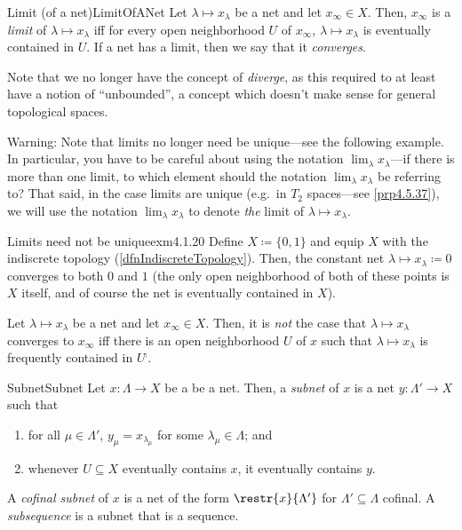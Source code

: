 \begin{dfn}{Limit (of a net)}{LimitOfANet}
Let $\lambda \mapsto x_\lambda$ be a net and let $x_\infty \in X$.  Then, $x_\infty$ is a \emph{limit} of $\lambda \mapsto x_\lambda$ iff for every open neighborhood $U$ of $x_\infty$, $\lambda \mapsto x_{\lambda}$ is eventually contained in $U$.  If a net has a limit, then we say that it \emph{converges}.
\begin{rmk}
Note that we no longer have the concept of \emph{diverge}, as this required to at least have a notion of ``unbounded'', a concept which doesn't make sense for general topological spaces.
\end{rmk}
\begin{wrn}
Warning:  Note that limits no longer need be unique---see the following example.  In particular, you have to be careful about using the notation $\lim _{\lambda}x_{\lambda}$---if there is more than one limit, to which element should the notation $\lim _{\lambda}x_{\lambda}$ be referring to?  That said, in the case limits are unique (e.g.\ in $T_2$ spaces---see \cref{prp4.5.37}), we will use the notation $\lim _{\lambda}x_{\lambda}$ to denote \emph{the} limit of $\lambda \mapsto x_{\lambda}$.
\end{wrn}
\end{dfn}
\begin{exm}{Limits need not be unique}{exm4.1.20}
Define $X\coloneqq \{ 0,1\}$ and equip $X$ with the indiscrete topology (\cref{dfnIndiscreteTopology}).  Then, the constant net $\lambda \mapsto x_\lambda \coloneqq 0$ converges to both $0$ and $1$ (the only open neighborhood of both of these points is $X$ itself, and of course the net is eventually contained in $X$).
\end{exm}
\begin{prp}{}{}
Let $\lambda \mapsto x_{\lambda}$ be a net and let $x_{\infty}\in X$.  Then, it is \emph{not} the case that $\lambda \mapsto x_{\lambda}$ converges to $x_{\infty}$ iff there is an open neighborhood $U$ of $x$ such that $\lambda \mapsto x_{\lambda}$ is frequently contained in $U^{\comp}$.
\end{prp}
\begin{dfn}{Subnet}{Subnet}
Let $x:\Lambda \rightarrow X$ be a be a net.  Then, a \emph{subnet} of $x$ is a net $y:\Lambda '\rightarrow X$ such that
\begin{enumerate}
\item for all $\mu \in \Lambda '$, $y_\mu =x_{\lambda _\mu}$ for some $\lambda _\mu \in \Lambda$; and
\item whenever $U\subseteq X$ eventually contains $x$, it eventually contains $y$.
\end{enumerate}
A \emph{cofinal subnet} of $x$ is a net of the form $\restr{x}{\Lambda'}$ for $\Lambda '\subseteq \Lambda$ cofinal.  A \emph{subsequence} is a subnet that is a sequence.
\end{dfn}
